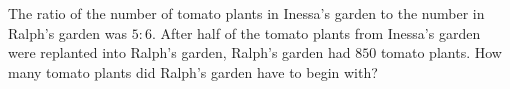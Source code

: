 The ratio of the number of tomato plants in Inessa's garden to the number in Ralph's garden was $5:6$. After half of the tomato plants from Inessa's garden were replanted into Ralph's garden, Ralph's garden had $850$ tomato plants. How many tomato plants did Ralph's garden have to begin with?
